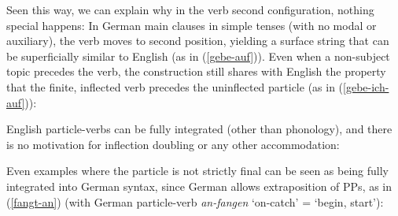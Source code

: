 \documentclass[output=paper]{langscibook}
\begin{document}
Seen this way, we can explain why in the verb second configuration, nothing special happens: In German main clauses in simple tenses (with no modal or auxiliary), the verb moves to second position, yielding a surface string that can be superficially similar to English (as in (\ref{gebe-auf})). Even when a non-subject topic precedes the verb, the construction still shares with English the property that the finite, inflected verb precedes the uninflected particle (as in (\ref{gebe-ich-auf})):

\ea
{}
\z\z 

English particle-verbs can be fully integrated (other than phonology), and there is no motivation for inflection doubling or any other accommodation:

\ea\label{v2-verb-particlea}
\z\z 

Even examples where the particle is not strictly final can be seen as being fully integrated into German syntax, since German allows extraposition of PPs, as in (\ref{fangt-an}) (with German particle-verb \textit{an-fangen} `on-catch' = `begin, start'):

\ea\label{kickt-off}
\z\z 
\end{document}
